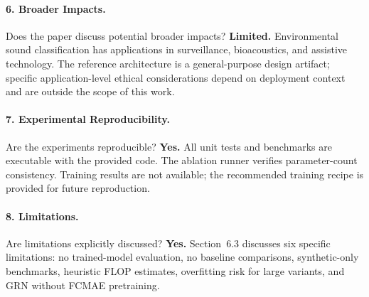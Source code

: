 \documentclass{article}
\begin{document}
\paragraph{6. Broader Impacts.}
Does the paper discuss potential broader impacts?
\textbf{Limited.} Environmental sound classification has applications in
surveillance, bioacoustics, and assistive technology. The reference architecture
is a general-purpose design artifact; specific application-level ethical
considerations depend on deployment context and are outside the scope of this
work.

\paragraph{7. Experimental Reproducibility.}
Are the experiments reproducible?
\textbf{Yes.} All unit tests and benchmarks are executable with the provided
code. The ablation runner verifies parameter-count consistency. Training
results are not available; the recommended training recipe is provided for
future reproduction.

\paragraph{8. Limitations.}
Are limitations explicitly discussed?
\textbf{Yes.} Section~6.3 discusses six specific limitations: no trained-model
evaluation, no baseline comparisons, synthetic-only benchmarks, heuristic FLOP
estimates, overfitting risk for large variants, and GRN without FCMAE
pretraining.
\end{document}
